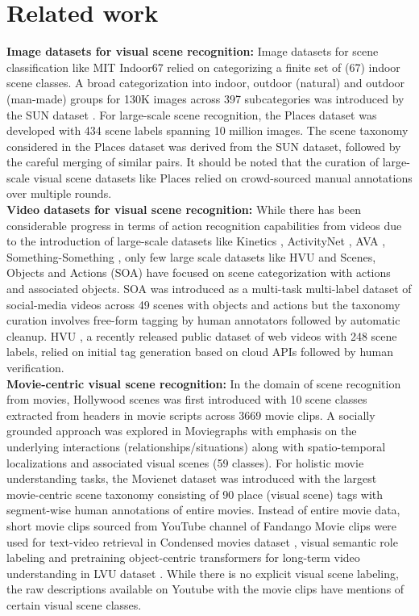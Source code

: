 \section{Related work}
\textbf{Image datasets for visual scene recognition:}
Image datasets for scene classification like MIT Indoor67 \cite{IndoorScenes} relied on categorizing a finite set of (67) indoor scene classes. A broad categorization into indoor, outdoor (natural) and outdoor (man-made) groups for 130K images across 397 subcategories was introduced by the SUN dataset \cite{xiao_sun_2016}. For large-scale scene recognition, the Places dataset \cite{zhou2017places} was developed with 434 scene labels spanning 10 million images. The scene taxonomy considered in the Places dataset was derived from the SUN dataset, followed by the careful merging of similar pairs. It should be noted that the curation of large-scale visual scene datasets like Places relied on crowd-sourced manual annotations over multiple rounds.\\
\textbf{Video datasets for visual scene recognition:} While there has been considerable progress in terms of action recognition capabilities from videos due to the introduction of large-scale datasets like Kinetics \cite{kinetics400}, ActivityNet \cite{caba2015activitynet}, AVA \cite{gu2018ava}, Something-Something \cite{Something-SomethingV2}, only few large scale datasets like HVU \cite{diba_large_2020} and Scenes, Objects and Actions (SOA) \cite{SOA} have focused on scene categorization with actions and associated objects. SOA was introduced as a multi-task multi-label dataset of social-media videos across 49 scenes with objects and actions but the taxonomy curation involves free-form tagging by human annotators followed by automatic cleanup. 
HVU \cite{diba_large_2020}, a recently released public dataset of web videos with 248 scene labels, relied on initial tag generation based on cloud APIs followed by human verification.\\
\textbf{Movie-centric visual scene recognition:} In the domain of scene recognition from movies, Hollywood scenes \cite{marszalek09} was first introduced with 10 scene classes extracted from headers in movie scripts across 3669 movie clips. A socially grounded approach was explored in Moviegraphs \cite{moviegraphs} with emphasis on the underlying interactions (relationships/situations) along with spatio-temporal localizations and associated visual scenes (59 classes).
For holistic movie understanding tasks, the Movienet dataset\cite{huang2020movienet} was introduced with the largest movie-centric scene taxonomy consisting of 90 place (visual scene) tags with segment-wise human annotations of entire movies. Instead of entire movie data, short movie clips sourced from YouTube channel of Fandango Movie clips were used for text-video retrieval in Condensed movies dataset \cite{bain2020condensed}, visual semantic role labeling \cite{Sadhu_2021_CVPR} and pretraining object-centric transformers \cite{transformers} for long-term video understanding in LVU dataset \cite{lvu2021}. While there is no explicit visual scene labeling, the raw descriptions available on Youtube with the movie clips have mentions of certain visual scene classes.
